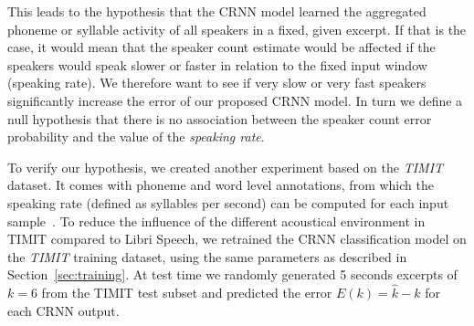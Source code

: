 \par
This leads to the hypothesis that the CRNN model learned the aggregated phoneme or syllable activity of all speakers in a fixed, given excerpt.
If that is the case, it would mean that the speaker count estimate would be affected if the speakers would speak slower or faster in relation to the fixed input window (speaking rate).
We therefore want to see if very slow or very fast speakers significantly increase the error of our proposed CRNN model.
In turn we define a null hypothesis that there is no association between the speaker count error probability and the value of the \emph{speaking rate}.
\par
To verify our hypothesis, we created another experiment based on the \emph{TIMIT} dataset.
It comes with phoneme and word level annotations, from which the speaking rate (defined as syllables per second) can be computed for each input sample~\cite{Jiao16}.
To reduce the influence of the different acoustical environment in TIMIT compared to Libri Speech, we retrained the CRNN classification model on the \emph{TIMIT} training dataset, using the same parameters as described in Section~\ref{sec:training}.
At test time we randomly generated 5 seconds excerpts of \(k=6\) from the TIMIT test subset and predicted the error \(E(k) = \hat{k} - k\) for each CRNN output.
